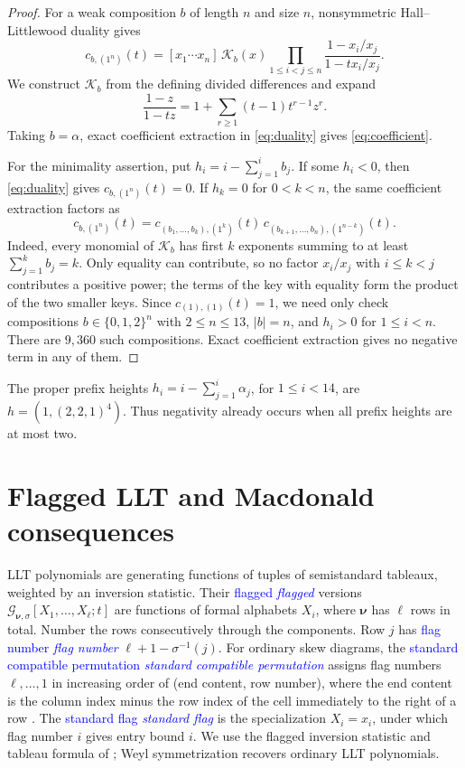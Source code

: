 \documentclass[10pt,reqno]{amsart}
\newcommand{\keyK}{\mathcal{K}}
\newcommand{\flagLLT}{\mathcal{G}}
\newcommand{\defin}[1]{%
  \relax\ifmmode\textcolor{blue}{#1}%
  \else\textcolor{blue}{\emph{#1}}\fi}
\begin{document}
\begin{proof}
For a weak composition $b$ of length $n$ and size $n$,
nonsymmetric Hall--Littlewood duality gives
\begin{equation}\label{eq:duality}
 c_{b,(1^n)}(t)=
 [x_1\dotsm x_n]\,\keyK_b(x)
 \prod_{1\leq i<j\leq n}\frac{1-x_i/x_j}{1-tx_i/x_j}.
\end{equation}
We construct $\keyK_b$ from the defining divided differences and expand
\[
 \frac{1-z}{1-tz}=1+\sum_{r\geq1}(t-1)t^{r-1}z^r.
\]
Taking $b=\alpha$, exact coefficient extraction in \eqref{eq:duality} gives
\eqref{eq:coefficient}.

For the minimality assertion, put $h_i=i-\sum_{j=1}^i b_j$.
If some $h_i<0$, then \eqref{eq:duality} gives $c_{b,(1^n)}(t)=0$.
If $h_k=0$ for $0<k<n$, the same coefficient extraction factors as
\[
 c_{b,(1^n)}(t)=
 c_{(b_1,\dotsc,b_k),(1^k)}(t)\,
 c_{(b_{k+1},\dotsc,b_n),(1^{n-k})}(t).
\]
Indeed, every monomial of $\keyK_b$ has first $k$ exponents summing to at
least $\sum_{j=1}^k b_j=k$.  Only equality can contribute, so no factor
$x_i/x_j$ with $i\leq k<j$ contributes a positive power; the terms of the
key with equality form the product of the two smaller keys.
Since $c_{(1),(1)}(t)=1$, we need only check compositions
$b\in\{0,1,2\}^n$ with $2\leq n\leq13$, $|b|=n$, and $h_i>0$ for
$1\leq i<n$.  There are $9{,}360$ such compositions.  Exact coefficient
extraction gives no negative term in any of them.
\end{proof}

The proper prefix heights $h_i=i-\sum_{j=1}^i\alpha_j$, for $1\leq i<14$, are
$h=(1,(2,2,1)^4)$.  Thus negativity already occurs when all prefix heights
are at most two.

\section{Flagged LLT and Macdonald consequences}

LLT polynomials are generating functions of tuples of semistandard tableaux,
weighted by an inversion statistic.  Their \defin{flagged} versions
$\flagLLT_{\boldsymbol{\nu},\sigma}[X_1,\dotsc,X_\ell;t]$ are functions of
formal alphabets $X_i$, where $\boldsymbol{\nu}$ has $\ell$ rows in total.
Number the rows consecutively through the components.  Row $j$ has
\defin{flag number} $\ell+1-\sigma^{-1}(j)$.
For ordinary skew diagrams, the \defin{standard compatible permutation}
assigns flag numbers $\ell,\dotsc,1$ in increasing order of
(end content, row number), where the end content is the column index minus
the row index of the cell immediately to the right of a row
\cite[Definition~6.1.6 and Lemma~6.1.7]{BlasiakHaimanMorsePunSeelinger2025x}.
The \defin{standard flag} is the specialization $X_i=x_i$, under which
flag number $i$ gives entry bound $i$.  We use the flagged inversion
statistic and tableau formula of
\cite[Definition~6.4.8 and Corollary~6.4.11]{BlasiakHaimanMorsePunSeelinger2025x};
Weyl symmetrization recovers ordinary LLT polynomials.
\end{document}
